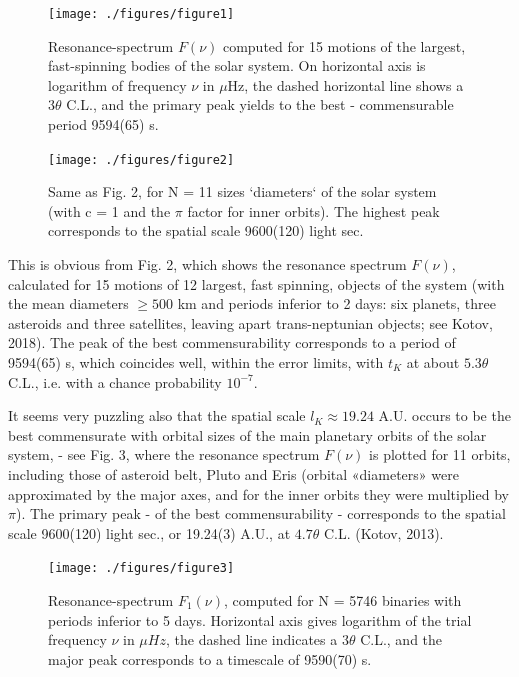 \documentclass[twoside,draft]{article}
\begin{document}
\begin{sloppypar}
\begin{figure}
\centering
\texttt{[image: ./figures/figure1]}
\caption{Resonance-spectrum $F(\nu)$ computed for 15 motions of the largest, fast-spinning bodies of the solar system. On horizontal axis is logarithm of frequency $\nu$ in $\mu$Hz, the dashed horizontal line shows a $ 3 \theta $ C.L., and the primary peak yields to the best - commensurable period 9594(65) s.}
\label{fig:figure_label}
\end{figure}

\begin{figure}
\centering
\texttt{[image: ./figures/figure2]}
\caption{Same as Fig. 2, for N = 11 sizes `diameters` of the solar system (with c = 1 and the $\pi$ factor for inner orbits). The highest peak corresponds to the spatial scale 9600(120) light sec.}
\label{fig:figure_label}
\end{figure}

This is obvious from Fig. 2, which shows the resonance spectrum $F( \nu )$, calculated for 15 motions of 12 largest, fast spinning, objects of the system (with the mean diameters $\geq 500$ km and periods inferior to 2 days: six planets, three asteroids and three satellites, leaving apart trans-neptunian objects; see Kotov, 2018). The peak of the best commensurability corresponds to a period of 9594(65) s, which coincides well, within the error limits, with $t_K$ at about $5.3 \theta$ C.L., i.e. with a chance probability $10^{-7}$.

It seems very puzzling also that the spatial scale $l_{K} \approx 19.24$ A.U. occurs to be the best commensurate with orbital sizes of the main planetary orbits of the solar system, - see Fig. 3, where the resonance spectrum $F( \nu )$ is plotted for 11 orbits, including those of asteroid belt, Pluto and Eris (orbital «diameters» were approximated by the major axes, and for the inner orbits they were multiplied by $\pi$). The primary peak - of the best commensurability - corresponds to the spatial scale 9600(120) light sec., or 19.24(3) A.U., at $4.7 \theta$ C.L. (Kotov, 2013).



\begin{figure}
\centering
\texttt{[image: ./figures/figure3]}
\caption{Resonance-spectrum $F_{1} ( \nu)$, computed for N = 5746 binaries with periods inferior to 5 days. Horizontal axis gives logarithm of the trial frequency $\nu$ in $\mu Hz$, the dashed line indicates a $3 \theta$ C.L., and the major peak corresponds to a timescale of 9590(70) s.}
\label{fig:figure_label}
\end{figure}



\end{sloppypar}
\end{document}
